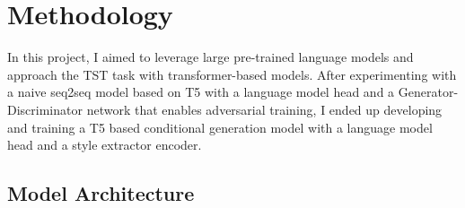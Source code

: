 \documentclass[a2paper]{article}
\begin{document}
\section{Methodology}

In this project, I aimed to leverage large pre-trained language models and approach the TST task with transformer-based models. After experimenting with a naive seq2seq model based on T5 with a language model head and a Generator-Discriminator network that enables adversarial training, I ended up developing and training a T5 based conditional generation model with a language model head and a style extractor encoder.

\subsection{Model Architecture}
\end{document}
